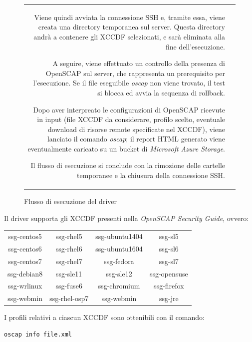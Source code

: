 \documentclass[../main.tex]{subfiles}
\begin{document}
\begin{figure}[H]
\begin{tabular}{rl}
\begin{minipage}{0.54\textwidth}
Viene quindi avviata la connessione SSH e, tramite essa, viene creata una directory temporanea sul server. Questa directory andrà a contenere gli XCCDF selezionati, e sarà eliminata alla fine dell'esecuzione.

A seguire, viene effettuato un controllo della presenza di OpenSCAP sul server, che rappresenta un prerequisito per l'esecuzione. Se il file eseguibile \textit{oscap} non viene trovato, il test si blocca ed avvia la sequenza di rollback.

Dopo aver interpreato le configurazioni di OpenSCAP ricevute in input (file XCCDF da considerare, profilo scelto, eventuale download di risorse remote specificate nel XCCDF), viene lanciato il comando \textit{oscap}; il report HTML generato viene eventualmente caricato su un bucket di \textit{Microsoft Azure Storage}.

Il flusso di esecuzione si conclude con la rimozione delle cartelle temporanee e la chiusura della connessione SSH.

\end{minipage} 
\end{tabular}

\caption{Flusso di esecuzione del driver}\label{fig:flussodriver1}
\end{figure}
Il driver supporta gli XCCDF presenti nella \textit{OpenSCAP Security Guide}, ovvero:
\begin{table}[H]
    \begin{tabulary}{\textwidth}{cccc}

         
        ssg-centos5 & ssg-rhel5     & ssg-ubuntu1404 & ssg-sl5      \\
        ssg-centos6 & ssg-rhel6     & ssg-ubuntu1604 & ssg-sl6      \\
        ssg-centos7 & ssg-rhel7     & ssg-fedora     & ssg-sl7      \\
        ssg-debian8 & ssg-sle11     & ssg-sle12      & ssg-opensuse \\
        ssg-wrlinux & ssg-fuse6     & ssg-chromium   & ssg-firefox  \\
        ssg-webmin  & ssg-rhel-osp7 & ssg-webmin     & ssg-jre

    \end{tabulary}
\end{table}

I profili relativi a ciascun XCCDF sono ottenibili con il comando:
\begin{Verbatim}[frame=single]
oscap info file.xml
\end{Verbatim}
\end{document}
